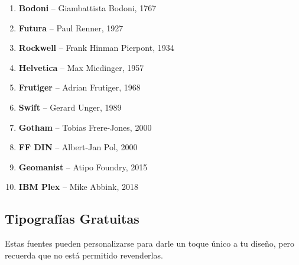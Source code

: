 \documentclass[
  jou,
  floatsintext,
  longtable,
  a4paper,
  nolmodern,
  notxfonts,
  notimes,
  colorlinks=true,linkcolor=blue,citecolor=blue,urlcolor=blue]{apa7}
\providecommand{\tightlist}{%
  \setlength{\itemsep}{0pt}\setlength{\parskip}{0pt}}
\begin{document}
\begin{enumerate}
\def\labelenumi{\arabic{enumi}.}
\tightlist
\item
  \textbf{Bodoni} -- Giambattista Bodoni, 1767\\
\item
  \textbf{Futura} -- Paul Renner, 1927\\
\item
  \textbf{Rockwell} -- Frank Hinman Pierpont, 1934\\
\item
  \textbf{Helvetica} -- Max Miedinger, 1957\\
\item
  \textbf{Frutiger} -- Adrian Frutiger, 1968\\
\item
  \textbf{Swift} -- Gerard Unger, 1989\\
\item
  \textbf{Gotham} -- Tobias Frere-Jones, 2000\\
\item
  \textbf{FF DIN} -- Albert-Jan Pol, 2000\\
\item
  \textbf{Geomanist} -- Atipo Foundry, 2015
\item
  \textbf{IBM Plex} -- Mike Abbink, 2018
\end{enumerate}

\subsection{Tipografías Gratuitas}\label{tipografuxedas-gratuitas}

Estas fuentes pueden personalizarse para darle un toque único a tu
diseño, pero recuerda que no está permitido revenderlas.
\end{document}
